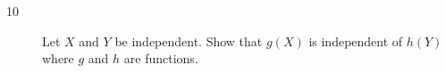 \documentclass[chapter={02}]{exercises_allofstats}
\begin{document}
\begin{description}
    \item[10] Let $X$ and $Y$ be independent. Show that $g(X)$ is independent of $h(Y)$ where $g$ and $h$ are functions.
    
\end{description}
\end{document}
